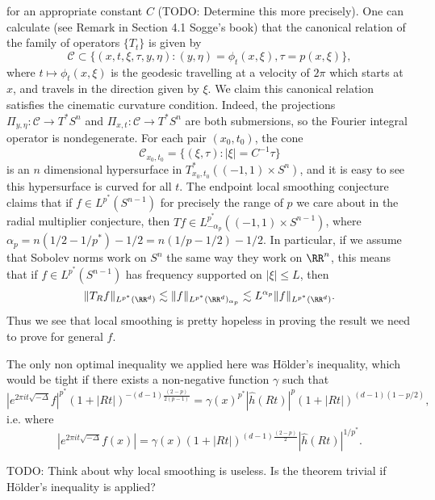for an appropriate constant $C$ (TODO: Determine this more precisely). One can calculate (see Remark in Section 4.1 Sogge's book) that the canonical relation of the family of operators $\{ T_t \}$ is given by
%
\[ \mathcal{C} \subset \{ (x,t,\xi,\tau,y,\eta) : (y,\eta) = \phi_t(x,\xi), \tau = p(x,\xi) \}, \]
%
where $t \mapsto \phi_t(x,\xi)$ is the geodesic travelling at a velocity of $2\pi$ which starts at $x$, and travels in the direction given by $\xi$. We claim this canonical relation satisfies the cinematic curvature condition. Indeed, the projections $\Pi_{y,\eta}: \mathcal{C} \to T^* S^n$ and $\Pi_{x,t}: \mathcal{C} \to T^* S^n$ are both submersions, so the Fourier integral operator is nondegenerate. For each pair $(x_0,t_0)$, the cone
%
\[ \mathcal{C}_{x_0,t_0} = \{ (\xi,\tau) : |\xi| = C^{-1} \tau \} \]
%
is an $n$ dimensional hypersurface in $T_{x_0,t_0}^*((-1,1) \times S^n)$, and it is easy to see this hypersurface is curved for all $t$. The endpoint local smoothing conjecture claims that if $f \in L^{p^*}(S^{n-1})$ for precisely the range of $p$ we care about in the radial multiplier conjecture, then $T f \in L^{p^*}_{-\alpha_p}((-1,1) \times S^{n-1})$, where $\alpha_p = n(1/2 - 1/p^*) - 1/2 = n(1/p - 1/2) - 1/2$. In particular, if we assume that Sobolev norms work on $S^n$ the same way they work on $\RR^n$, this means that if $f \in L^{p^*}(S^{n-1})$ has frequency supported on $|\xi| \leq L$, then
%
\[ \| T_R f \|_{L^{p^*}(\RR^d)} \lesssim \| f \|_{L^{p^*}(\RR^d)_{\alpha_p}} \lesssim L^{\alpha_p} \| f \|_{L^{p^*}(\RR^d)}. \]
%
Thus we see that local smoothing is pretty hopeless in proving the result we need to prove for general $f$.

The only non optimal inequality we applied here was H\"{o}lder's inequality, which would be tight if there exists a non-negative function $\gamma$ such that
%
\[ |e^{2 \pi i t \sqrt{-\Delta}} f|^{p^*} (1 + |Rt|)^{-(d-1)\frac{(2-p)}{2(p-1)}} = \gamma(x)^{p^*} |\widehat{h}(Rt)|^p (1 + |Rt|)^{(d-1)(1-p/2)}, \]
%
i.e. where
%
\[ |e^{2 \pi i t \sqrt{-\Delta}} f(x)| = \gamma(x) (1 + |Rt|)^{(d-1) \frac{(2-p)}{2}} |\widehat{h}(Rt)|^{1/p^*}. \]

TODO: Think about why local smoothing is useless. Is the theorem trivial if H\"{o}lder's inequality is applied?

%
%
%
%
%
%

